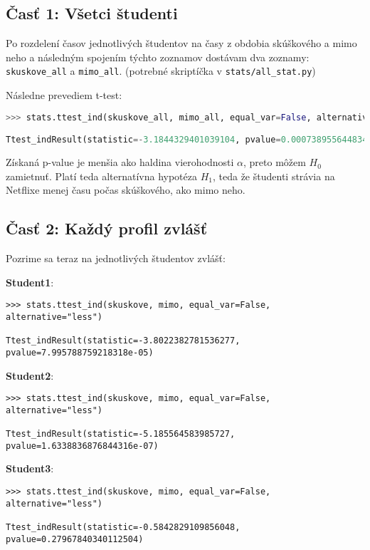 \documentclass[10pt,a4paper]{article}
\begin{document}
\subsection*{Časť 1: Všetci študenti}
Po rozdelení časov jednotlivých študentov na časy z obdobia skúškového a mimo neho a následným spojením týchto zoznamov dostávam dva zoznamy: \verb|skuskove_all| a \verb|mimo_all|. (potrebné skriptíčka v \verb|stats/all_stat.py|)

Následne prevediem t-test: 
\begin{lstlisting}[language=Python]
>>> stats.ttest_ind(skuskove_all, mimo_all, equal_var=False, alternative="less")

Ttest_indResult(statistic=-3.1844329401039104, pvalue=0.0007389556448342999)
\end{lstlisting}

Získaná p-value je menšia ako haldina vierohodnosti $\alpha$, preto môžem $H_0$ zamietnuť. Platí teda alternatívna hypotéza $H_1$, teda že študenti strávia na Netflixe menej času počas skúškového, ako mimo neho.

\subsection*{Časť 2: Každý profil zvlášť}
Pozrime sa teraz na jednotlivých študentov zvlášť:

\textbf{Student1}:

\begin{lstlisting}
>>> stats.ttest_ind(skuskove, mimo, equal_var=False, alternative="less")

Ttest_indResult(statistic=-3.8022382781536277, pvalue=7.995788759218318e-05)
\end{lstlisting}

\textbf{Student2}:

\begin{lstlisting}
>>> stats.ttest_ind(skuskove, mimo, equal_var=False, alternative="less")

Ttest_indResult(statistic=-5.185564583985727, pvalue=1.6338836876844316e-07)
\end{lstlisting}

\textbf{Student3}:

\begin{lstlisting}
>>> stats.ttest_ind(skuskove, mimo, equal_var=False, alternative="less")

Ttest_indResult(statistic=-0.5842829109856048, pvalue=0.27967840340112504)
\end{lstlisting}
\end{document}
